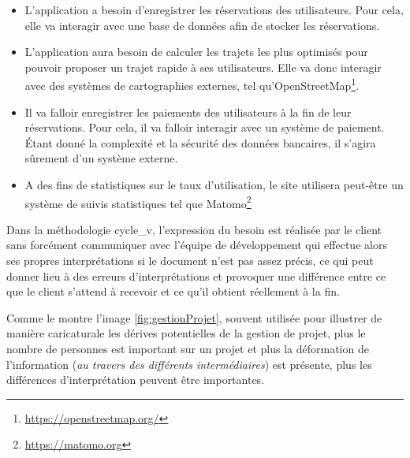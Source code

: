 \begin{itemize}
	\setlength\itemsep{0em}
	\item L'application a besoin d'enregistrer les réservations des utilisateurs. Pour cela, elle va interagir avec une base de données afin de stocker les réservations.
	\item L'application aura besoin de calculer les trajets les plus optimisés pour pouvoir proposer un trajet rapide à ses utilisateurs. Elle va donc interagir avec des systèmes de cartographies externes, tel qu'OpenStreetMap\footnote{\url{https://openstreetmap.org/}}.
	\item Il va falloir enregistrer les paiements des utilisateurs à la fin de leur réservations. Pour cela, il va falloir interagir avec un système de paiement. Étant donné la complexité et la sécurité des données bancaires, il s'agira sûrement d'un système externe.
	\item A des fins de statistiques sur le taux d'utilisation, le site utilisera peut-être un système de suivis statistiques tel que Matomo\footnote{\url{https://matomo.org}} 
\end{itemize}

Dans la méthodologie \gls{cycle_v}, l'expression du besoin est réalisée par le client sans forcément communiquer avec l'équipe de développement qui effectue alors ses propres interprétations si le document n'est pas assez précis, ce qui peut donner lieu à des erreurs d'interprétations et provoquer une différence entre ce que le client s'attend à recevoir et ce qu'il obtient réellement à la fin.


Comme le montre l'image \ref{fig:gestionProjet}, souvent utilisée pour illustrer de manière caricaturale les dérives potentielles de la gestion de projet, plus le nombre de personnes est important sur un projet et plus la déformation de l'information (\emph{au travers des différents intermédiaires}) est présente, plus les différences d'interprétation peuvent être importantes. 

